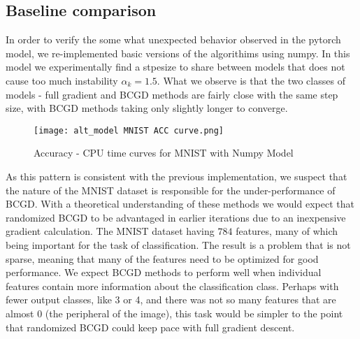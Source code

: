 \documentclass{article}
\begin{document}
\subsection{Baseline comparison}
In order to verify the some what unexpected behavior observed in the pytorch model, we re-implemented basic versions of the algorithims using numpy. In this model we experimentally find a stpesize to share between models that does not cause too much instability $\alpha_k = 1.5$.
What we observe is that the two classes of models - full gradient and BCGD methods are fairly close with the same step size, with BCGD methods taking only slightly longer to converge.
\begin{figure}[H]
    \centering
    \texttt{[image: alt\_model MNIST ACC curve.png]}
    \caption{Accuracy - CPU time curves for MNIST with Numpy Model}
    \label{fig:np_MNIST}
\end{figure}
As this pattern is consistent with the previous implementation, we suspect that the nature of the MNIST dataset is responsible for the under-performance of BCGD. With a theoretical understanding of these methods we would expect that randomized BCGD to be advantaged in earlier iterations due to an inexpensive gradient calculation. The MNIST dataset having $784$ features, many of which being important for the task of classification. The result is a problem that is not sparse, meaning that many of the features need to be optimized for good performance. We expect BCGD methods to perform well when individual features contain more information about the classification class. Perhaps with fewer output classes, like 3 or 4, and there was not so many features that are almost 0 (the peripheral of the image), this task would be simpler to the point that randomized BCGD could keep pace with full gradient descent.
\end{document}
